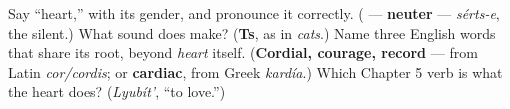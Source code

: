 \begin{tcolorbox}[breakable,colback=teal!4,colframe=teal!35!black,title={Before you move on}]
Say \textquotedblleft{}heart,\textquotedblright{} with its gender, and pronounce it correctly. (\textbf{} — \textbf{neuter} — \emph{sérts-e}, the \textbf{} silent.) What sound does \textbf{} make? (\textbf{Ts}, as in \emph{cats}.) Name three English words that share its root, beyond \emph{heart} itself. (\textbf{Cordial, courage, record} — from Latin \emph{cor/cordis}; or \textbf{cardiac}, from Greek \emph{kardía}.) Which Chapter 5 verb is what the heart does? (\emph{Lyubít'}, \textquotedblleft{}to love.\textquotedblright{})
\end{tcolorbox}
